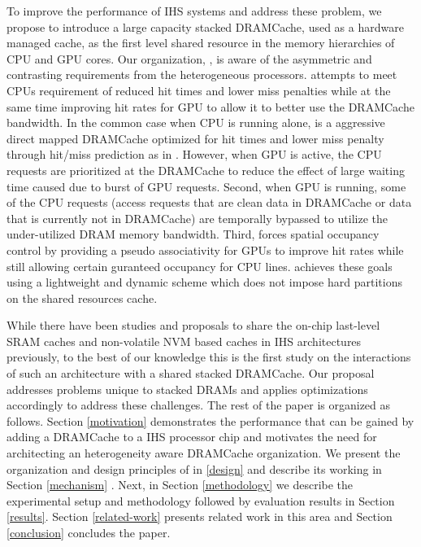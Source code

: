 To improve the performance of IHS systems and address these problem, we propose to introduce a large capacity stacked DRAMCache, used as a hardware managed cache, as the first level shared resource in the memory hierarchies of CPU and GPU cores. Our organization, \cachename, is aware of the asymmetric and contrasting requirements from the heterogeneous processors. \cachename attempts to meet CPUs requirement of reduced hit times and lower miss penalties while at the same time improving hit rates for GPU to allow it to better use the DRAMCache bandwidth. In the common case when CPU is running alone, \textit{\cachename} is a aggressive direct mapped DRAMCache optimized for hit times and lower miss penalty through hit/miss prediction as in \cite{alloy}. However, when GPU is active, the CPU requests are prioritized at the DRAMCache to reduce the effect of large waiting time caused due to burst of GPU requests. Second, when GPU is running, some of the CPU requests (access requests that are clean data in DRAMCache or data that is currently not in DRAMCache) are temporally bypassed to utilize the under-utilized DRAM memory bandwidth. 
Third, \cachename forces spatial occupancy control by providing a pseudo associativity for GPUs to improve hit rates while still allowing certain guranteed occupancy for CPU lines. \cachename achieves these goals using a lightweight and dynamic scheme which does not impose hard partitions on the shared resources cache.


\par While there have been studies and proposals to share the on-chip last-level SRAM caches \cite{helm} and non-volatile NVM based caches \cite{oscar} in IHS architectures previously, to the best of our knowledge this is the first study on the interactions of such an architecture with a shared stacked DRAMCache. Our proposal \cachename addresses problems unique to stacked DRAMs and applies optimizations accordingly to address these challenges. The rest of the paper is organized as follows. Section \ref{motivation} demonstrates the performance that can be gained by adding a DRAMCache to a IHS processor chip and motivates the need for architecting an heterogeneity aware DRAMCache organization. We present the organization and design principles of \cachename in \ref{design} and  describe its working in Section \ref{mechanism} . Next, in Section \ref{methodology} we describe the experimental setup and methodology followed by evaluation results in Section \ref{results}. Section \ref{related-work} presents related work in this area and Section \ref{conclusion} concludes the paper.
